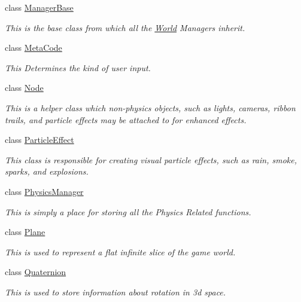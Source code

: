 \begin{DoxyCompactItemize}
class \hyperlink{classphys_1_1ManagerBase}{ManagerBase}
\begin{DoxyCompactList}\small\item\em This is the base class from which all the \hyperlink{classphys_1_1World}{World} Managers inherit. \item\end{DoxyCompactList}\item 
class \hyperlink{classphys_1_1MetaCode}{MetaCode}
\begin{DoxyCompactList}\small\item\em This Determines the kind of user input. \item\end{DoxyCompactList}\item 
class \hyperlink{classphys_1_1Node}{Node}
\begin{DoxyCompactList}\small\item\em This is a helper class which non-\/physics objects, such as lights, cameras, ribbon trails, and particle effects may be attached to for enhanced effects. \item\end{DoxyCompactList}\item 
class \hyperlink{classphys_1_1ParticleEffect}{ParticleEffect}
\begin{DoxyCompactList}\small\item\em This class is responsible for creating visual particle effects, such as rain, smoke, sparks, and explosions. \item\end{DoxyCompactList}\item 
class \hyperlink{classphys_1_1PhysicsManager}{PhysicsManager}
\begin{DoxyCompactList}\small\item\em This is simply a place for storing all the Physics Related functions. \item\end{DoxyCompactList}\item 
class \hyperlink{classphys_1_1Plane}{Plane}
\begin{DoxyCompactList}\small\item\em This is used to represent a flat infinite slice of the game world. \item\end{DoxyCompactList}\item 
class \hyperlink{classphys_1_1Quaternion}{Quaternion}
\begin{DoxyCompactList}\small\item\em This is used to store information about rotation in 3d space. \item\end{DoxyCompactList}\item 

\end{DoxyCompactItemize}
